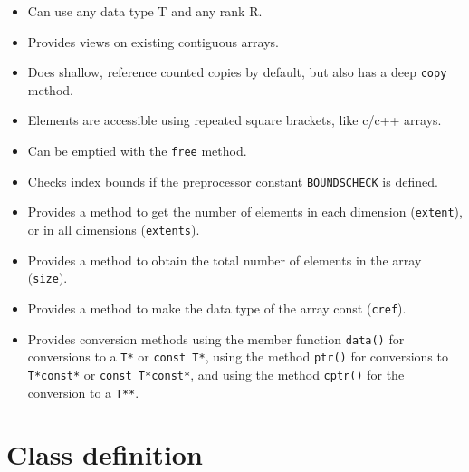 \documentclass[12pt,twoside]{article}
\begin{document}
\begin{itemize}\itemsep0pt\parskip2pt
\item Can use any data type T and any rank R.
\item Provides views on existing contiguous arrays.
\item Does shallow, reference counted copies by default, but also has a
  deep {\tt copy} method.
\item Elements are accessible using repeated square brackets, like c/c++ arrays.
\item Can be emptied with the {\tt free} method.
\item Checks index bounds if the preprocessor
  constant {\tt BOUNDSCHECK} is defined. 
\item Provides a method to get the number of elements in each
  dimension (\texttt{extent}), or in all dimensions (\texttt{extents}).
\item Provides  a method to obtain the total number of elements in the
  array (\texttt{size}).
\item Provides a method to make the data type of the array const
  (\texttt{cref}).
\item Provides conversion methods using the member
  function \texttt{data()} for conversions to a \texttt{T*} or
  \texttt{const T*}, using the method \texttt{ptr()} for
  conversions to \texttt{T*const*} or \texttt{const T*const*}, and
  using the method \texttt{cptr()} for the conversion to a
  \texttt{T**}.
\end{itemize}

\section{Class definition}
\end{document}
